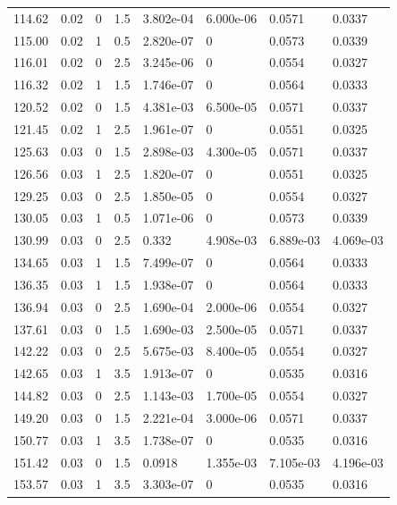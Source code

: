 \documentclass[preview]{standalone}
\begin{document}
{{{\begin{tabular}{L{1.2cm}C{1.2cm} C{0.3cm}C{0.5cm} C{1.4cm}C{1.4cm} C{1.4cm}C{1.4cm}}
  114.62  &  0.02  & 0     & 1.5 &  3.802e-04  & 6.000e-06  & 0.0571 &  0.0337   \\ 
  115.00  &  0.02  & 1     & 0.5 &  2.820e-07  & 0  & 0.0573 &  0.0339   \\ 
  116.01  &  0.02  & 0     & 2.5 &  3.245e-06  & 0  & 0.0554 &  0.0327   \\ 
  116.32  &  0.02  & 1     & 1.5 &  1.746e-07  & 0  & 0.0564 &  0.0333   \\ 
  120.52  &  0.02  & 0     & 1.5 &  4.381e-03  & 6.500e-05  & 0.0571 &  0.0337   \\ 
  121.45  &  0.02  & 1     & 2.5 &  1.961e-07  & 0  & 0.0551 &  0.0325   \\ 
  125.63  &  0.03  & 0     & 1.5 &  2.898e-03  & 4.300e-05  & 0.0571 &  0.0337   \\ 
  126.56  &  0.03  & 1     & 2.5 &  1.820e-07  & 0  & 0.0551 &  0.0325   \\ 
  129.25  &  0.03  & 0     & 2.5 &  1.850e-05  & 0  & 0.0554 &  0.0327   \\ 
  130.05  &  0.03  & 1     & 0.5 &  1.071e-06  & 0  & 0.0573 &  0.0339   \\ 
  130.99  &  0.03  & 0     & 2.5 &  0.332  & 4.908e-03  & 6.889e-03 &  4.069e-03   \\ 
  134.65  &  0.03  & 1     & 1.5 &  7.499e-07  & 0  & 0.0564 &  0.0333   \\ 
  136.35  &  0.03  & 1     & 1.5 &  1.938e-07  & 0  & 0.0564 &  0.0333   \\ 
  136.94  &  0.03  & 0     & 2.5 &  1.690e-04  & 2.000e-06  & 0.0554 &  0.0327   \\ 
  137.61  &  0.03  & 0     & 1.5 &  1.690e-03  & 2.500e-05  & 0.0571 &  0.0337   \\ 
  142.22  &  0.03  & 0     & 2.5 &  5.675e-03  & 8.400e-05  & 0.0554 &  0.0327   \\ 
  142.65  &  0.03  & 1     & 3.5 &  1.913e-07  & 0  & 0.0535 &  0.0316   \\ 
  144.82  &  0.03  & 0     & 2.5 &  1.143e-03  & 1.700e-05  & 0.0554 &  0.0327   \\ 
  149.20  &  0.03  & 0     & 1.5 &  2.221e-04  & 3.000e-06  & 0.0571 &  0.0337   \\ 
  150.77  &  0.03  & 1     & 3.5 &  1.738e-07  & 0  & 0.0535 &  0.0316   \\ 
  151.42  &  0.03  & 0     & 1.5 &  0.0918  & 1.355e-03  & 7.105e-03 &  4.196e-03   \\ 
  153.57  &  0.03  & 1     & 3.5 &  3.303e-07  & 0  & 0.0535 &  0.0316   \\ 

\end{tabular}}}}
\end{document}
